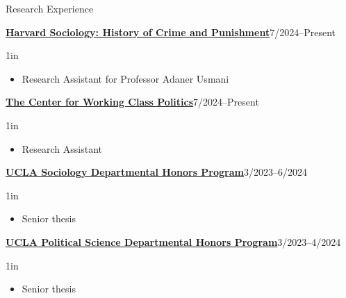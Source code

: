 \documentclass[12pt]{resume} %
\newcommand{\righthandindent}{1in}
\begin{document}
\begin{rSection}{Research Experience}

\href{https://sociology.fas.harvard.edu/}{\textbf{Harvard Sociology: History of Crime and Punishment}}\hfill 7/2024--Present
\begin{adjustwidth}{0pt}{\righthandindent}
\vspace{-7pt}
\begin{itemize}[leftmargin=1em, itemsep=0pt]
    \item[] Research Assistant for Professor Adaner Usmani
\end{itemize}
\end{adjustwidth}

\href{https://www.workingclasspolitics.org/}{\textbf{The Center for Working Class Politics}}\hfill 7/2024--Present
\begin{adjustwidth}{0pt}{\righthandindent}
\vspace{-7pt}
\begin{itemize}[leftmargin=1em, itemsep=0pt]
    \item[] Research Assistant
\end{itemize}
\end{adjustwidth}

\href{https://soc.ucla.edu/undergraduate-study/department-honors-program/}{\textbf{UCLA Sociology Departmental Honors Program}}\hfill{}3/2023--6/2024
\begin{adjustwidth}{0pt}{\righthandindent}
\vspace{-7pt}
\begin{itemize}[leftmargin=1em, itemsep=0pt]
    \item[] Senior thesis
\end{itemize}
\end{adjustwidth}

\href{https://polisci.ucla.edu/academics/undergraduate/honors-program/}{\textbf{UCLA Political Science Departmental Honors Program}}\hfill{}3/2023--4/2024
\begin{adjustwidth}{0pt}{\righthandindent}
\vspace{-7pt}
\begin{itemize}[leftmargin=1em, itemsep=0pt]
    \item[] Senior thesis
\end{itemize}
\end{adjustwidth}


\end{rSection}
\end{document}
